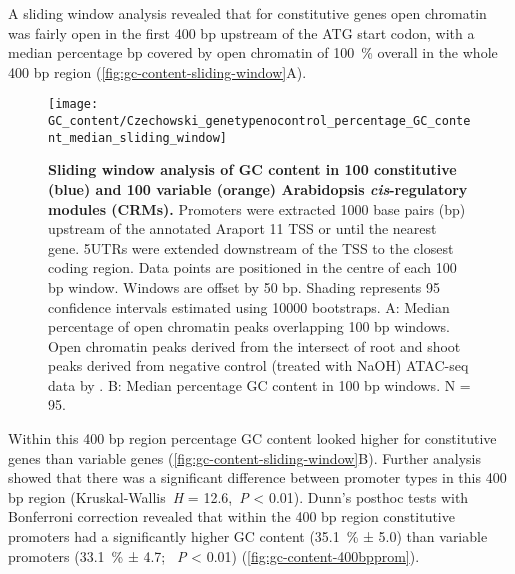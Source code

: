 \documentclass[../main.tex]{subfiles}
\begin{document}
A sliding window analysis revealed that for constitutive genes open chromatin was fairly open in the first 400 bp upstream of the ATG start codon, with a median percentage bp covered by open chromatin of \SI{100}{\percent} overall in the whole 400 bp region  (\autoref{fig:gc-content-sliding-window}A).
\begin{figure}[hbt!]
	\begin{center}
		\capstart
		\texttt{[image: GC\_content/Czechowski\_genetypenocontrol\_percentage\_GC\_content\_median\_sliding\_window]}
		\caption{
			\textbf{Sliding window analysis of GC content in 100 constitutive (blue) and 100 variable (orange) Arabidopsis \textit{cis}\hyp{}regulatory modules (CRMs).}
			Promoters were extracted 1000 base pairs (bp) upstream of the annotated Araport 11 \autocite{chengAraport11CompleteReannotation2017} TSS or until the nearest gene.
			5UTRs were extended downstream of the TSS to the closest coding region.
			Data points are positioned in the centre of each 100 bp window.
			Windows are offset by 50 bp.
			Shading represents 95 confidence intervals estimated using 10000 bootstraps.
			A: Median percentage of open chromatin peaks overlapping 100 bp windows. Open chromatin peaks derived from the intersect of root and shoot peaks derived from negative control (treated with NaOH) ATAC\hyp{}seq data by \textcite{potterCytokininModulatesContextdependent2018}.	
			B: Median percentage GC content in 100 bp windows. N = 95.
			\label{fig:gc-content-sliding-window}
		}
	\end{center}
\end{figure}
Within this 400 bp region percentage GC content looked higher for constitutive genes than variable genes (\autoref{fig:gc-content-sliding-window}B).
Further analysis showed that there was a significant difference between promoter types in this 400 bp region (Kruskal\hyp{}Wallis~\textit{H} = 12.6,~\textit{P} \textless{} 0.01).
Dunn's posthoc tests with Bonferroni correction revealed that within the 400 bp region constitutive promoters had a significantly higher GC content (\SI{35.1}{\percent} ± 5.0) than variable promoters (\SI{33.1}{\percent} ± 4.7; ~\textit{P} \textless{} 0.01) (\autoref{fig:gc-content-400bpprom}).
\end{document}
